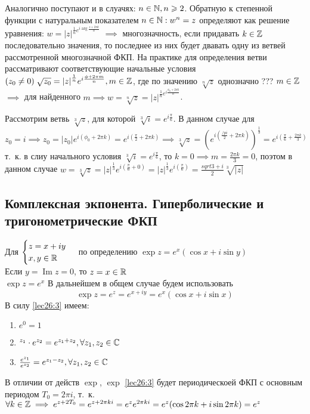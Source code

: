 \documentclass[../../main.tex]{subfiles}
\begin{document}
Аналогично поступают и в слуачях: $n \in \mathbb{N}, n \geqslant 2$.
Обратную к степенной функции с натуральным показателем $n \in \mathbb{N}: w^n = z$
определяют как решение уравнения: 
$w = {|z|}^{\frac{1}{n}e^{i\operatorname{arg}\frac{z + 2 \pi k}{n}}}$ 
$\implies$ многозначность, если придавать $k \in \mathbb{Z}$ последовательно
значения, то последнее из них будет двавать одну из ветвей рассмотренной
многозначной ФКП. На практике для определения ветви рассматривают 
соответствующие начальные условия 
$(z_0 \neq 0)\; \sqrt{z_0} = {|z|}^{\frac{1}{n}}e^{i
\frac{\phi + 2 \pi m}{n}}, m \in \mathbb{Z}$, где по значению 
$\sqrt[n]{z}$ однозначно ??? $m \in \mathbb{Z}$ $\implies$ для найденного 
$m \implies w = \sqrt[n]{z} = |z|^{\frac{1}{n} 
e^{i \frac{\phi_0 + 2 \pi k}{n}}}$.


\begin{example}
 Рассмотрим ветвь $\sqrt[3]{z}$, для которой 
 $\sqrt[3]{i} = e ^{i \frac{\pi}{6}}$. В данном случае для 
 $z_0 = i \implies z_0 = |z_0| e^{i(\phi_0 + 2 \pi k)} = 
 e^{i(\frac{\pi}{2} + 2 \pi k)} \implies \sqrt[3]{z} = 
 (e^{i(\frac{/pi}{2} + 2 \pi k)})^{\frac{1}{3}} =
 e^{i(\frac{\pi}{6} + \frac{2 \pi k}{3})}$ \\
 т.~к. в слиу начального условия 
 $\sqrt[3]{i} = e ^{i \frac{\pi}{6}}$, то 
 $k = 0 \implies m = \frac{2 \pi k }{3} = 0$, 
 поэтом в данном случае $w = \sqrt[3]{z}
 = {|z|}^{\frac{1}{3}}e ^{i( \frac{\pi}{6} + 0)}
 = {|z|}^{\frac{1}{3}}e ^{i( \frac{\pi}{6})} 
 = \frac{sqrt{3} + i }{2} \sqrt[3]{|z|}$
\end{example}

\subsection{Комплексная экпонента. Гиперболические и тригонометрические ФКП}
Для 
$
\begin{cases}
 z = x + iy \\
 x, y \in \mathbb{R}
\end{cases}
$
по определению $\exp{z} = e^x(\cos x + i \sin y) $ \\
Если $y = \operatorname{Im} z = 0$, то $z = x \in \mathbb{R}$ \\
$\exp z = e^x$
В дальнейшем в общем случае будем использовать
\begin{equation}
\label{lec26:3}
 \exp{z} = e^z = e^{x + iy} = e^{x}(\cos x + i \sin x)
\end{equation}
В силу \eqref{lec26:3} имеем:
 \begin{enumerate}
    \item $e^0 = 1$
    \item $^{z_1} \cdot e^{z_2} = e^{z_1 + z_2}, \forall z_1, z_2 \in \mathbb{C}$
    \item $\frac{e^{z_1}}{e^{z_2}} = e^{z_1 - z_2}, \forall z_1, z_2 \in \mathbb{C}$
 \end{enumerate}
В отличии от действ $\exp$, $\exp$ \eqref{lec26:3} будет 
периодическоей ФКП с основным периодом $T_0 = 2\pi i$, т.~к.
$\forall k \in \mathbb{Z} \implies e^{z + 2 T_0} = e^{z + 2 \pi k i} 
= e^{z} e^{2 \pi k i} = e^z(\cos{2 \pi k} + i \sin{2 \pi k}) = e^z$
\end{document}
